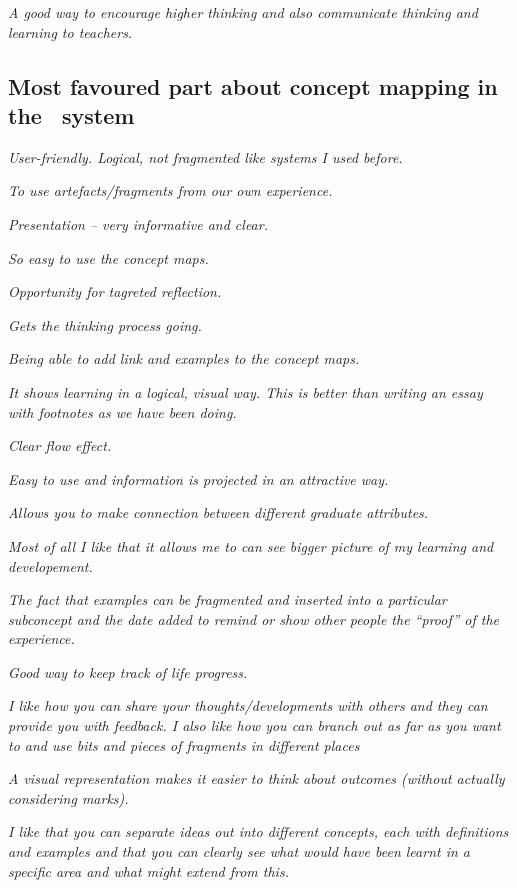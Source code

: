 \textit{A good way to encourage higher thinking and also communicate thinking
and learning to teachers.}


\subsection{Most favoured part about concept mapping in the \ep~system}

\textit{User-friendly. Logical, not fragmented like systems I used before.}

\textit{To use artefacts/fragments from our own experience.}

\textit{Presentation -- very informative and clear.}

\textit{So easy to use the concept maps.}

\textit{Opportunity for tagreted reflection.}

\textit{Gets the thinking process going.}

\textit{Being able to add link and examples to the concept maps.}

\textit{It shows learning in a logical, visual way. This is better than writing
an essay with footnotes as we have been doing.}

\textit{Clear flow effect.}

\textit{Easy to use and information is projected in an attractive way.}

\textit{Allows you to make connection between different graduate attributes.}

\textit{Most of all I like that it allows me to can see bigger picture of
my learning and developement.}

\textit{The fact that examples can be fragmented and inserted into a particular
subconcept and the date added to remind or show other people the ``proof'' of the
experience.}

\textit{Good way to keep track of life progress.}

\textit{I like how you can share your thoughts/developments with others and they
can provide you with feedback. I also like how you can branch out as far as you
want to and use bits and pieces of fragments in different places}

\textit{A visual representation makes it easier to think about outcomes (without
actually considering marks).}

\textit{I like that you can separate ideas out into different concepts, each
with definitions and examples and that you can clearly see what would have been
learnt in a specific area and what might extend from this.}

